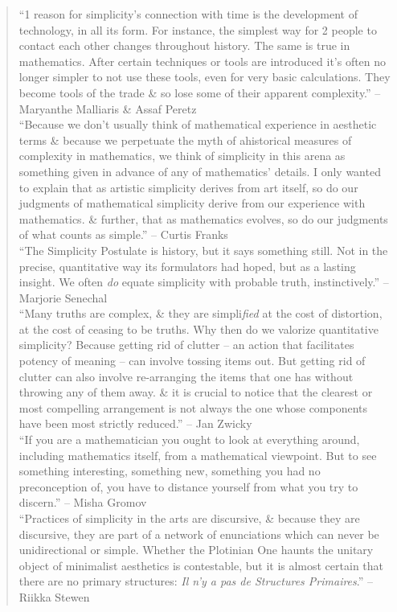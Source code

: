 \documentclass[oneside]{book}
\numberwithin{equation}{section}
\begin{document}
\begin{quotation}
	``1 reason for simplicity's connection with time is the development of technology, in all its form. For instance, the simplest way for 2 people to contact each other changes throughout history. The same is true in mathematics. After certain techniques or tools are introduced it's often no longer simpler to not use these tools, even for very basic calculations. They become tools of the trade \& so lose some of their apparent complexity.'' -- Maryanthe Malliaris \& Assaf Peretz\\
	
	``Because we don't usually think of mathematical experience in aesthetic terms \& because we perpetuate the myth of ahistorical measures of complexity in mathematics, we think of simplicity in this arena as something given in advance of any of mathematics' details. I only wanted to explain that as artistic simplicity derives from art itself, so do our judgments of mathematical simplicity derive from our experience with mathematics. \& further, that as mathematics evolves, so do our judgments of what counts as simple.'' -- Curtis Franks\\
	
	``The Simplicity Postulate is history, but it says something still. Not in the precise, quantitative way its formulators had hoped, but as a lasting insight. We often \textit{do} equate simplicity with probable truth, instinctively.'' -- Marjorie Senechal\\
	
	``Many truths are complex, \& they are simpli\textit{fied} at the cost of distortion, at the cost of ceasing to be truths. Why then do we valorize quantitative simplicity? Because getting rid of clutter -- an action that facilitates potency of meaning -- can involve tossing items out. But getting rid of clutter can also involve re-arranging the items that one has without throwing any of them away. \& it is crucial to notice that the clearest or most compelling arrangement is not always the one whose components have been most strictly reduced.'' -- Jan Zwicky\\
	
	``If you are a mathematician you ought to look at everything around, including mathematics itself, from a mathematical viewpoint. But to see something interesting, something new, something you had no preconception of, you have to distance yourself from what you try to discern.'' -- Misha Gromov\\
	
	``Practices of simplicity in the arts are discursive, \& because they are discursive, they are part of a network of enunciations which can never be unidirectional or simple. Whether the Plotinian One haunts the unitary object of minimalist aesthetics is contestable, but it is almost certain that there are no primary structures: \textit{Il n'y a pas de Structures Primaires}.'' -- Riikka Stewen\\
	

\end{quotation}
\end{document}
